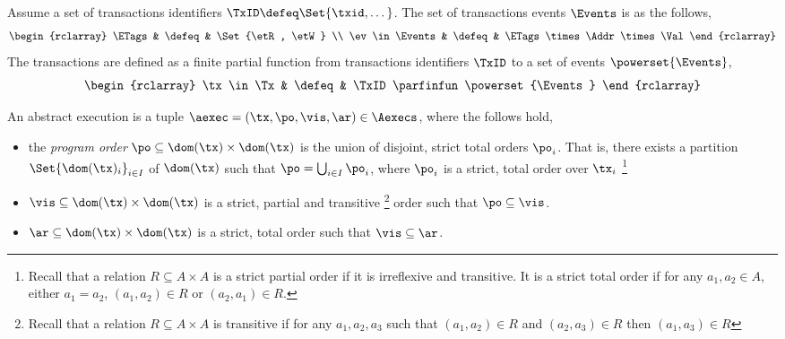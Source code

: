 \begin{defn}[transactions]
Assume a set of transactions identifiers \( \TxID \defeq \Set{\txid, \dots}\).
The set of transactions events \( \Events \) is as the follows,
\[
\begin{rclarray}
\ETags & \defeq & \Set{\etR, \etW} \\
\ev \in \Events & \defeq  & \ETags \times \Addr \times \Val
\end{rclarray}
\]
The transactions are defined as a finite partial function from transactions identifiers \( \TxID \) to a set of events \( \powerset{\Events} \),
\[
\begin{rclarray}
\tx \in \Tx & \defeq & \TxID \parfinfun \powerset{\Events}
\end{rclarray}
\]
\end{defn}


\begin{defn}
\label{def:abs-exec}
An abstract execution is a tuple $\aexec = (\tx, \po, \vis, \ar) \in \Aexecs$, where the follows hold,

\begin{itemize}
\item
the \emph{program order} $\po \subseteq \dom(\tx) \times \dom(\tx)$ is the union of disjoint, strict total orders \( \po_{i} \).
That is, there exists a partition $\Set{ \dom(\tx)_{i} }_{i \in I}$ of $\dom(\tx)$ such that $\po = \bigcup_{i \in I} \po_{i}$, where $\po_{i}$ is a strict, total order over $\tx_i$%
\footnote{Recall that a relation $R \subseteq A \times A$ is a strict partial order if it is irreflexive and transitive.
It is a strict total order if for any $a_1, a_2 \in A$, either $a_1 = a_2$, $(a_1, a_2) \in R$ or $(a_2, a_1) \in R$.}

\item 
$\vis \subseteq \dom(\tx) \times \dom(\tx)$ is a strict, partial and transitive%
\footnote{Recall that a relation $R \subseteq A \times A$ is transitive if for any \( a_{1}, a_{2}, a_{3}\) such that \( (a_{1}, a_{2} ) \in R\) and \( (a_{2}, a_{3} ) \in R \) then \( (a_{1}, a_{3} ) \in R \)}
order such that $\po \subseteq \vis$. 

\item 
$\ar \subseteq \dom(\tx) \times \dom(\tx)$ is a strict, total order such that $\vis \subseteq \ar$.

\end{itemize}

\end{defn}


